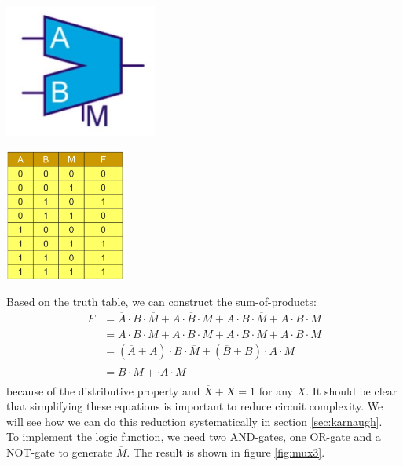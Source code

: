 \begin{minipage}{.5\textwidth}
	\centering
	\includegraphics[width=5cm]{figures/ch13/mux1.jpg}
	\label{fig:mux1}
\end{minipage}%
\begin{minipage}{.5\textwidth}
	\centering
	\includegraphics[width=4cm]{figures/ch13/mux2.jpg}
	\label{fig:mux2}
\end{minipage}
Based on the truth table, we can construct the sum-of-products:
\begin{align*}
	F &= \overline{A} \cdot B \cdot \overline{M} + A \cdot \overline{B} \cdot M + A \cdot B \cdot \overline{M} + A \cdot B \cdot M \\
	  &= \overline{A} \cdot B \cdot \overline{M} +  A \cdot B \cdot \overline{M}  + A \cdot \overline{B} \cdot M  + A \cdot B \cdot M \\	
	  &= (\overline{A} + A) \cdot B \cdot \overline{M} + (\overline{B} + B)  \cdot A \cdot M \\
	  &= B \cdot \overline{M} + \cdot A \cdot M \\
\end{align*}
because of the distributive property and $\overline{X} + X = 1$ for any $X$. It should be clear that simplifying these equations is important to reduce circuit complexity. We will see how we can do this reduction systematically in section \ref{sec:karnaugh}.\\
To implement the logic function, we need two AND-gates, one OR-gate and a NOT-gate to generate $\overline{M}$. The result is shown in figure \ref{fig:mux3}.

